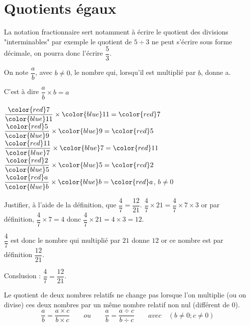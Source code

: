 \section{Quotients égaux}
\begin{remarque}
    La notation fractionnaire sert notamment à écrire le quotient des divisions "interminables" par exemple le quotient de $5\div 3$
    ne peut s'écrire sous forme décimale, on pourra donc l'écrire $\dfrac{5}{3}$.
\end{remarque}

\begin{definition}
    On note $\dfrac{a}{b}$, avec $b\neq 0$, le nombre qui, lorsqu'il est multiplié par $b$, donne a.

    C'est à dire $\dfrac{a}{b} \times b=a$
\end{definition}

\begin{exemples*1}
    \phantom{rrr}

    \medskip
    $\dfrac{{\color{red}7}}{{\color{blue}11}} \times {\color{blue}11}={\color{red}7}$
    \hfill
    $\dfrac{{\color{red}5}}{{\color{blue}9}} \times {\color{blue}9}={\color{red}5}$
    \hfill
    $\dfrac{{\color{red}11}}{{\color{blue}7}} \times {\color{blue}7}={\color{red}11}$
    \hfill
    $\dfrac{{\color{red}2}}{{\color{blue}5}} \times {\color{blue}5}={\color{red}2}$
    \hfill
    $\dfrac{{\color{red}a}}{{\color{blue}b}} \times {\color{blue}b}={\color{red}a}$, $b\neq 0$
\end{exemples*1}

\begin{exemple*1}
    Justifier, à l'aide de la définition, que $\dfrac{4}{7}=\dfrac{12}{21}$.
    \correction
    $\dfrac{4}{7}\times 21=\dfrac{4}{7}\times 7\times 3$ or par définition, $\dfrac{4}{7}\times 7=4$ donc $\dfrac{4}{7}\times 21=4\times 3 = 12$.

    $\dfrac{4}{7}$ est donc le nombre qui multiplié par $21$ donne $12$ or ce nombre est par définition $\dfrac{12}{21}$.

    Conslusion : $\dfrac{4}{7}=\dfrac{12}{21}$.
\end{exemple*1}

\begin{propriete}[\admise]
    Le quotient de deux nombres relatifs ne change pas lorsque l'on multiplie (ou on divise) ces deux nombres par un même nombre
    relatif non nul (différent de 0).
    $$\frac{a}{b}=\frac{a\times c}{b\times c}\qquad ou \qquad \frac{a}{b}=\frac{a\div
    c}{b\div c}\qquad avec \quad  (b\not=0; c\not=0)$$
\end{propriete}

